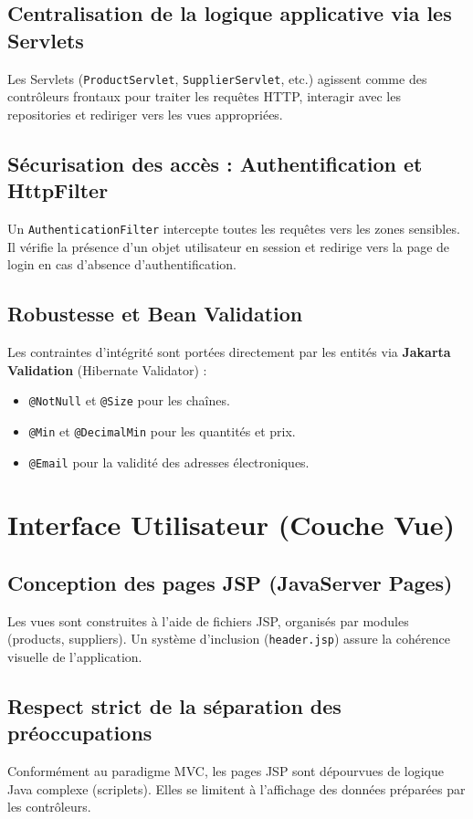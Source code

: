 \documentclass[12pt,a4paper]{report}
\begin{document}
\section{Centralisation de la logique applicative via les Servlets}
Les Servlets (\texttt{ProductServlet}, \texttt{SupplierServlet}, etc.) agissent comme des contrôleurs frontaux pour traiter les requêtes HTTP, interagir avec les repositories et rediriger vers les vues appropriées.

\section{Sécurisation des accès : Authentification et HttpFilter}
Un \texttt{AuthenticationFilter} intercepte toutes les requêtes vers les zones sensibles. Il vérifie la présence d'un objet utilisateur en session et redirige vers la page de login en cas d'absence d'authentification.

\section{Robustesse et Bean Validation}
Les contraintes d'intégrité sont portées directement par les entités via \textbf{Jakarta Validation} (Hibernate Validator) :
\begin{itemize}
    \item \texttt{@NotNull} et \texttt{@Size} pour les chaînes.
    \item \texttt{@Min} et \texttt{@DecimalMin} pour les quantités et prix.
    \item \texttt{@Email} pour la validité des adresses électroniques.
\end{itemize}

\chapter{Interface Utilisateur (Couche Vue)}

\section{Conception des pages JSP (JavaServer Pages)}
Les vues sont construites à l'aide de fichiers JSP, organisés par modules (products, suppliers). Un système d'inclusion (\texttt{header.jsp}) assure la cohérence visuelle de l'application.

\section{Respect strict de la séparation des préoccupations}
Conformément au paradigme MVC, les pages JSP sont dépourvues de logique Java complexe (scriplets). Elles se limitent à l'affichage des données préparées par les contrôleurs.
\end{document}
